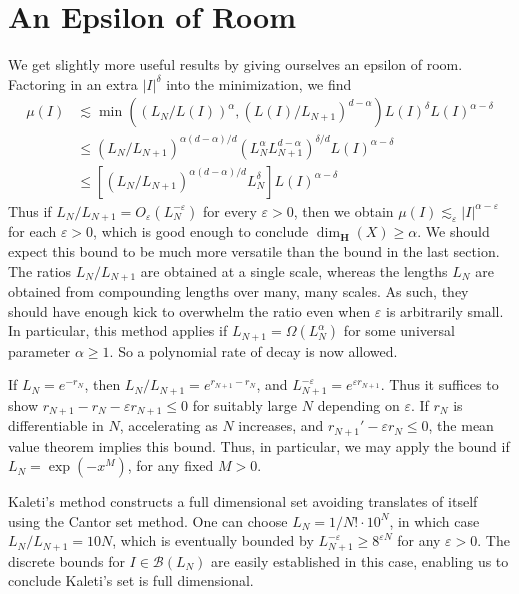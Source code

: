 \section{An Epsilon of Room}

We get slightly more useful results by giving ourselves an epsilon of room. Factoring in an extra $|I|^\delta$ into the minimization, we find
%
\begin{align*}
    \mu(I) &\lesssim \min((L_N/L(I))^\alpha, (L(I)/L_{N+1})^{d-\alpha}) L(I)^\delta L(I)^{\alpha - \delta}\\
    &\leq (L_N/L_{N+1})^{\alpha(d-\alpha)/d} (L_N^\alpha L_{N+1}^{d-\alpha})^{\delta/d} L(I)^{\alpha - \delta}\\
    &\leq \left[ (L_N/L_{N+1})^{\alpha(d-\alpha)/d} L_N^\delta \right] L(I)^{\alpha - \delta}
\end{align*}
%
Thus if $L_N/L_{N+1} = O_\varepsilon(L_N^{- \varepsilon})$ for every $\varepsilon > 0$, then we obtain $\mu(I) \lesssim_\varepsilon |I|^{\alpha - \varepsilon}$ for each $\varepsilon > 0$, which is good enough to conclude $\dim_{\mathbf{H}}(X) \geq \alpha$. We should expect this bound to be much more versatile than the bound in the last section. The ratios $L_N/L_{N+1}$ are obtained at a single scale, whereas the lengths $L_N$ are obtained from compounding lengths over many, many scales. As such, they should have enough kick to overwhelm the ratio even when $\varepsilon$ is arbitrarily small. In particular, this method applies if $L_{N+1} = \Omega(L_N^\alpha)$ for some universal parameter $\alpha \geq 1$. So a polynomial rate of decay is now allowed.

\begin{example}
    If $L_N = e^{-r_N}$, then $L_N/L_{N+1} = e^{r_{N+1} - r_N}$, and $L_{N+1}^{-\varepsilon} = e^{\varepsilon r_{N+1}}$. Thus it suffices to show $r_{N+1} - r_N - \varepsilon r_{N+1} \leq 0$ for suitably large $N$ depending on $\varepsilon$. If $r_N$ is differentiable in $N$, accelerating as $N$ increases, and $r_{N+1}' - \varepsilon r_N \leq 0$, the mean value theorem implies this bound. Thus, in particular, we may apply the bound if $L_N = \exp(-x^M)$, for any fixed $M > 0$.
\end{example}

\begin{example}
    Kaleti's method constructs a full dimensional set avoiding translates of itself using the Cantor set method. One can choose $L_N = 1/N! \cdot 10^N$, in which case $L_N/L_{N+1} = 10N$, which is eventually bounded by $L_{N+1}^{-\varepsilon} \geq 8^{\varepsilon N}$ for any $\varepsilon > 0$. The discrete bounds for $I \in \mathcal{B}(L_N)$ are easily established in this case, enabling us to conclude Kaleti's set is full dimensional.
\end{example}

